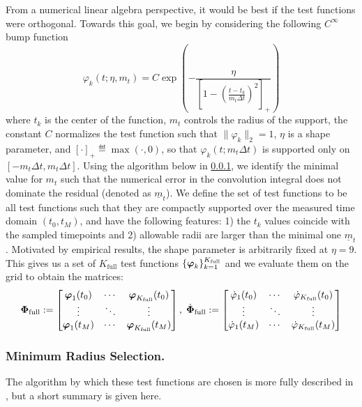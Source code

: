 From a numerical linear algebra perspective, it would be best if the test functions were orthogonal. Towards this goal, we begin by considering the following $C^\infty$ bump function
\begin{equation}
	\label{eq:test-fun}
	\varphi_k(t ; \eta, m_t)=C \exp \left(-\frac{\eta}{\left[1-(\tfrac{t-t_k}{m_t\Delta t} )^2\right]_{+}}\right)
\end{equation}
where $t_k$ is the center of the function, $m_t$ controls the radius of the support, the constant $C$ normalizes the test function such that $\|\varphi_k\|_2=1$, $\eta$ is a shape parameter, and $[\cdot]_{+}\eqdef\max (\cdot, 0)$, so that $\varphi_k(t ; m_t\Delta t)$ is supported only on $[-m_t\Delta t, m_t\Delta t]$. 
Using the algorithm below in \ref{appendix:minRadiusSelect}, we identify the minimal value for $m_t$ such that the numerical error in the convolution integral does not dominate the residual (denoted as $\underline{m}_t$). We define the set of test functions to be all test functions such that they are compactly supported over the measured time domain $(t_0,t_M)$, and have the following features: 1) the $t_k$ values coincide with the sampled timepoints and 2) allowable radii are larger than the minimal one $\underline{m}_t$. Motivated by empirical results, the shape parameter is arbitrarily fixed at $\eta=9$. This gives us a set of $K_\textrm{full}$ test functions $\{\boldsymbol{\varphi}_k\}_{k=1}^{K_\text{full}}$ and we evaluate them on the grid to obtain the matrices:
\[\boldsymbol{\Phi}_\text{full} := \begin{bmatrix}
	\boldsymbol{\varphi}_1(t_0) & \cdots & \boldsymbol{\varphi}_{K_\text{full}}(t_0)\\
	\vdots & \ddots & \vdots\\
	\boldsymbol{\varphi}_1(t_M) & \cdots & \boldsymbol{\varphi}_{K_\text{full}}(t_M)
\end{bmatrix}, \; \dot{\boldsymbol{\Phi}}_\text{full} := \begin{bmatrix}
	\dot{\varphi}_1(t_0) & \cdots & \dot{\varphi}_{K_\text{full}}(t_0)\\
	\vdots & \ddots & \vdots\\
	\dot{\varphi}_1(t_M) & \cdots & \dot{\varphi}_{K_\text{full}}(t_M)
\end{bmatrix}\]

\subsubsection{Minimum Radius Selection.} \label{appendix:minRadiusSelect}

The algorithm by which these test functions are chosen is more fully described in \citep{BortzMessengerDukic2023BullMathBiol}, but a short summary is given here. 

